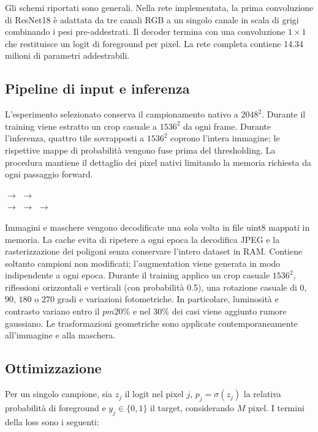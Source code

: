 Gli schemi riportati sono generali. Nella rete implementata, la prima convoluzione di
ResNet18 è adattata da tre canali RGB a un singolo canale in scala di grigi combinando i
pesi pre-addestrati. Il decoder termina con una convoluzione $1\times1$ che restituisce
un logit di foreground per pixel. La rete completa contiene 14.34 milioni di parametri
addestrabili.

\subsection{Pipeline di input e inferenza}

L'esperimento selezionato conserva il campionamento nativo a $2048^2$. Durante il
training viene estratto un crop casuale a $1536^2$ da ogni frame. Durante l'inferenza,
quattro tile sovrapposti a $1536^2$ coprono l'intera immagine; le rispettive mappe di
probabilità vengono fuse prima del thresholding. La procedura mantiene il dettaglio dei
pixel nativi limitando la memoria richiesta da ogni passaggio forward.

\begin{center}
\small
{}
$\longrightarrow$ 
$\longrightarrow$ \\[0.35em]
$\longrightarrow$ 
$\longrightarrow$ 
$\longrightarrow$ 
\end{center}

Immagini e maschere vengono decodificate una sola volta in file uint8 mappati in memoria.
La cache evita di ripetere a ogni epoca la decodifica JPEG e la rasterizzazione dei
poligoni senza conservare l'intero dataset in RAM. Contiene soltanto campioni non
modificati; l'augmentation viene generata in modo indipendente a ogni epoca. Durante il
training applico un crop casuale $1536^2$, riflessioni orizzontali e verticali (con
probabilità 0.5), una rotazione casuale di $0$, $90$, $180$ o $270$ gradi e variazioni
fotometriche. In particolare, luminosità e contrasto variano entro il $pm20\%$ e nel
30\% dei casi viene aggiunto rumore gaussiano. Le trasformazioni geometriche sono
applicate contemporaneamente all'immagine e alla maschera.

\subsection{Ottimizzazione}

Per un singolo campione, sia $z_j$ il logit nel pixel $j$, $p_j=\sigma(z_j)$ la relativa
probabilità di foreground e $y_j\in\{0,1\}$ il target, considerando $M$ pixel. I termini
della loss sono i seguenti:

